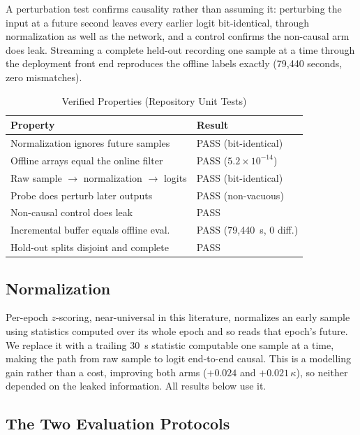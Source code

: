 \documentclass[conference]{IEEEtran}
\begin{document}
A perturbation test confirms causality rather than assuming it: perturbing the input at a future
second leaves every earlier logit bit-identical, through normalization as well as the network, and
a control confirms the non-causal arm does leak. Streaming a complete held-out recording one sample
at a time through the deployment front end reproduces the offline labels exactly (79{,}440 seconds,
zero mismatches).

\begin{table}[t]
\caption{Verified Properties (Repository Unit Tests)}
\label{tab:verified}
\centering
\footnotesize
\begin{tabular}{@{}p{}l@{}}
\toprule
Property & Result \\
\midrule
Normalization ignores future samples & PASS (bit-identical) \\
Offline arrays equal the online filter & PASS ($5.2\times10^{-14}$) \\
Raw sample $\to$ normalization $\to$ logits & PASS (bit-identical) \\
Probe does perturb later outputs & PASS (non-vacuous) \\
Non-causal control does leak & PASS \\
Incremental buffer equals offline eval. & PASS (79{,}440~s, 0 diff.) \\
Hold-out splits disjoint and complete & PASS \\
\bottomrule
\end{tabular}
\end{table}

\subsection{Normalization}

Per-epoch $z$-scoring, near-universal in this literature, normalizes an early sample using
statistics computed over its whole epoch and so reads that epoch's future. We replace it with a
trailing 30~s statistic computable one sample at a time, making the path from raw sample to logit
end-to-end causal. This is a modelling gain rather than a cost, improving both arms ($+0.024$ and
$+0.021\,\kappa$), so neither depended on the leaked information. All results below use it.

\subsection{The Two Evaluation Protocols}
\end{document}
